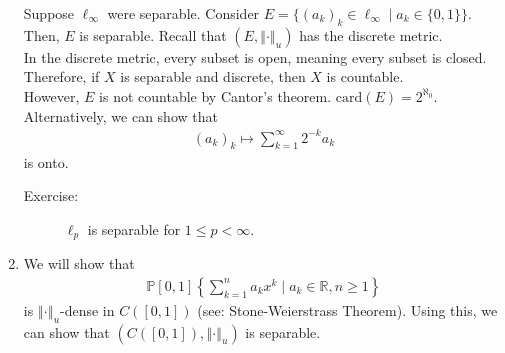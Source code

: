 \documentclass[9pt]{extarticle}
\newcommand{\card}{\text{card}}
\newcommand{\R}{\mathbb{R}}
\newcommand{\norm}[1]{\left\Vert #1 \right\Vert}
\begin{document}
\begin{enumerate}[(1)]
      Suppose $\ell_{\infty}$ were separable. Consider $E = \{(a_k)_k\in \ell_{\infty}\mid a_k \in \{0,1\}\}$. Then, $E$ is separable. Recall that $(E,\norm{\cdot}_u)$ has the discrete metric.\\

      In the discrete metric, every subset is open, meaning every subset is closed. Therefore, if $X$ is separable and discrete, then $X$ is countable.\\

      However, $E$ is not countable by Cantor's theorem. $\card(E) = 2^{\aleph_0}$.\\

      Alternatively, we can show that
      \begin{align*}
        (a_k)_k \mapsto \sum_{k=1}^{\infty}2^{-k}a_k
      \end{align*}
      is onto.
      \begin{description}
        \item[Exercise:] $\ell_p$ is separable for $1 \leq p < \infty$.
      \end{description}
    \item We will show that 
      \begin{align*}
        \mathbb{P}[0,1]\left\{\sum_{k=1}^{n}a_kx^k\mid a_k\in \R,n\geq 1\right\}
      \end{align*}
      is $\norm{\cdot}_u$-dense in $C([0,1])$ (see: Stone-Weierstrass Theorem). Using this, we can show that $(C([0,1]),\norm{\cdot}_u)$ is separable.
  \end{enumerate}
\end{document}
